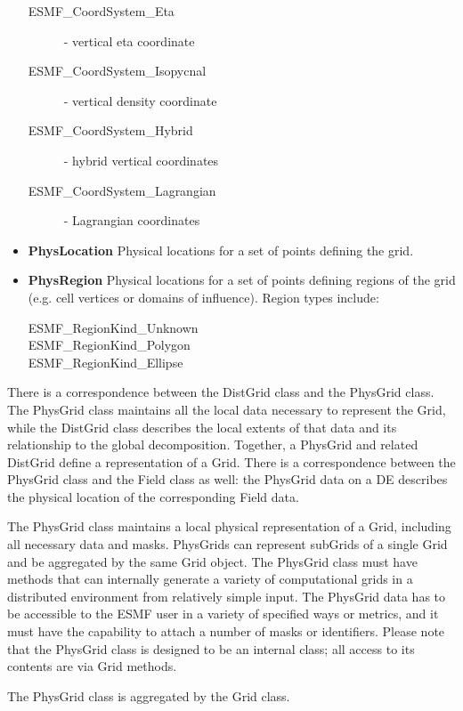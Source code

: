 \begin{itemize}
\begin{description}
\item[ESMF\_CoordSystem\_Eta] - vertical eta coordinate
\item[ESMF\_CoordSystem\_Isopycnal] - vertical density coordinate
\item[ESMF\_CoordSystem\_Hybrid] - hybrid vertical coordinates
\item[ESMF\_CoordSystem\_Lagrangian] - Lagrangian coordinates
\end{description}
\item {\bf PhysLocation} Physical locations for a set of points defining the grid.
\item {\bf PhysRegion} Physical locations for a set of points defining regions of
the grid (e.g. cell vertices or domains of influence).  Region types include:
\begin{description}
\item[ESMF\_RegionKind\_Unknown]
\item[ESMF\_RegionKind\_Polygon]
\item[ESMF\_RegionKind\_Ellipse]
\end{description}
\end{itemize}






There is a correspondence between the DistGrid class and the PhysGrid
class.  The PhysGrid class maintains all the local data necessary to
represent the Grid, while the DistGrid class describes the local extents
of that data and its relationship to the global decomposition.
Together, a PhysGrid and related DistGrid define a representation of
a Grid.  There is a correspondence between the PhysGrid class and the Field
class as well:  the PhysGrid data on a DE describes the physical location
of the corresponding Field data.

The PhysGrid class maintains a local physical representation of a Grid,
including all necessary data and masks.  PhysGrids can represent subGrids
of a single Grid and be aggregated by the same Grid object. The PhysGrid
class must have methods that can internally generate a variety of
computational grids in a distributed environment from relatively simple
input.  The PhysGrid data has to be accessible to the ESMF user in a
variety of specified ways or metrics, and it must have the capability to
attach a number of masks or identifiers.  Please note that the PhysGrid class
is designed to be an internal class; all access to its contents are via
Grid methods.


The PhysGrid class is aggregated by the Grid class.
